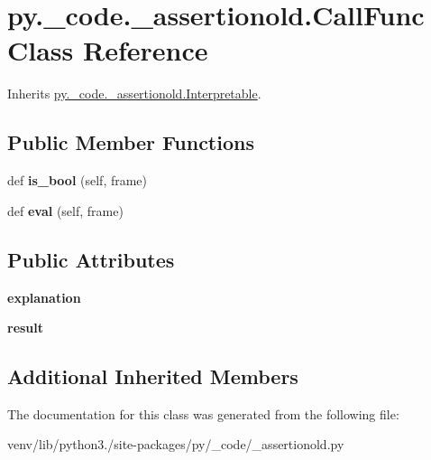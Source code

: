 \hypertarget{classpy_1_1__code_1_1__assertionold_1_1_call_func}{}\section{py.\+\_\+code.\+\_\+assertionold.\+Call\+Func Class Reference}
\label{classpy_1_1__code_1_1__assertionold_1_1_call_func}


Inherits \hyperlink{classpy_1_1__code_1_1__assertionold_1_1_interpretable}{py.\+\_\+code.\+\_\+assertionold.\+Interpretable}.

\subsection*{Public Member Functions}
\begin{DoxyCompactItemize}
\item 
\mbox{\label{classpy_1_1__code_1_1__assertionold_1_1_call_func_a4bc25c5e918c7cef9407d14514d0efb0}} 
def {\bfseries is\+\_\+bool} (self, frame)
\item 
\mbox{\label{classpy_1_1__code_1_1__assertionold_1_1_call_func_a40f200b0a47061ee2536f67a4bd18665}} 
def {\bfseries eval} (self, frame)
\end{DoxyCompactItemize}
\subsection*{Public Attributes}
\begin{DoxyCompactItemize}
\item 
\mbox{\label{classpy_1_1__code_1_1__assertionold_1_1_call_func_a19c5415b81427773772617fe3962db33}} 
{\bfseries explanation}
\item 
\mbox{\label{classpy_1_1__code_1_1__assertionold_1_1_call_func_acda71e8d70913fb075c9bd62c50ceee0}} 
{\bfseries result}
\end{DoxyCompactItemize}
\subsection*{Additional Inherited Members}


The documentation for this class was generated from the following file\+:\begin{DoxyCompactItemize}
\item 
venv/lib/python3./site-\/packages/py/\+\_\+code/\+\_\+assertionold.\+py\end{DoxyCompactItemize}
